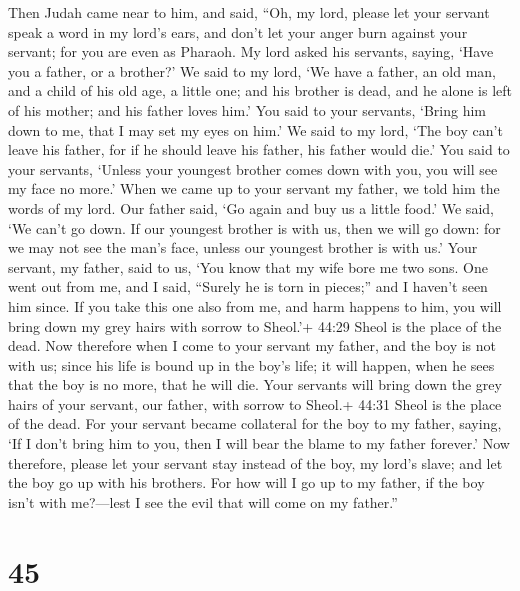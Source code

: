  Then Judah came near to him, and said, ``Oh, my lord,
please let your servant speak a word in my lord's ears, and don't let
your anger burn against your servant; for you are even as Pharaoh.
 My lord asked his servants, saying, `Have you a father, or
a brother?'  We said to my lord, `We have a father, an old
man, and a child of his old age, a little one; and his brother is dead,
and he alone is left of his mother; and his father loves him.'
 You said to your servants, `Bring him down to me, that I
may set my eyes on him.'  We said to my lord, `The boy
can't leave his father, for if he should leave his father, his father
would die.'  You said to your servants, `Unless your
youngest brother comes down with you, you will see my face no more.'
 When we came up to your servant my father, we told him the
words of my lord.  Our father said, `Go again and buy us a
little food.'  We said, `We can't go down. If our youngest
brother is with us, then we will go down: for we may not see the man's
face, unless our youngest brother is with us.'  Your
servant, my father, said to us, `You know that my wife bore me two sons.
 One went out from me, and I said, ``Surely he is torn in
pieces;'' and I haven't seen him since.  If you take this
one also from me, and harm happens to him, you will bring down my grey
hairs with sorrow to Sheol.'+ 44:29 Sheol is the place of the dead.
 Now therefore when I come to your servant my father, and
the boy is not with us; since his life is bound up in the boy's life;
 it will happen, when he sees that the boy is no more, that
he will die. Your servants will bring down the grey hairs of your
servant, our father, with sorrow to Sheol.+ 44:31 Sheol is the place of
the dead.  For your servant became collateral for the boy
to my father, saying, `If I don't bring him to you, then I will bear the
blame to my father forever.'  Now therefore, please let
your servant stay instead of the boy, my lord's slave; and let the boy
go up with his brothers.  For how will I go up to my
father, if the boy isn't with me?---lest I see the evil that will come
on my father.''

\hypertarget{section-44}{%
\section{45}\label{section-44}}

